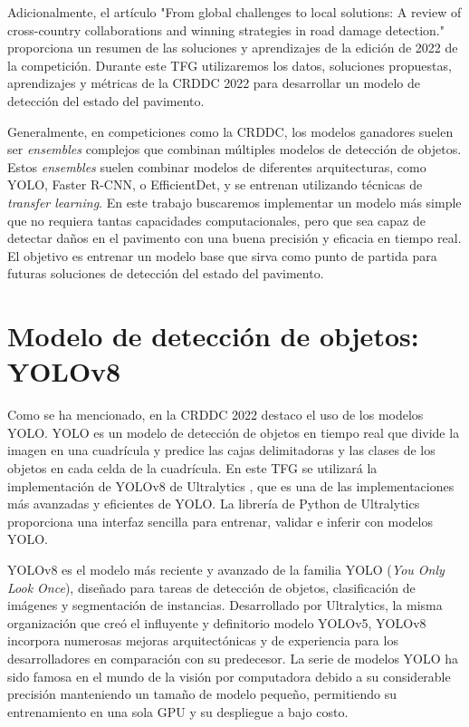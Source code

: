Adicionalmente, el artículo "From global challenges to local solutions: A review of cross-country collaborations and winning strategies in road damage detection." \cite{CRDDC2022_review} proporciona un resumen de las soluciones y aprendizajes de la edición de 2022 de la competición. Durante este TFG utilizaremos los datos, soluciones propuestas, aprendizajes y métricas de la CRDDC 2022 para desarrollar un modelo de detección del estado del pavimento.

Generalmente, en competiciones como la CRDDC, los modelos ganadores suelen ser \textit{ensembles} complejos que combinan múltiples modelos de detección de objetos. Estos \textit{ensembles} suelen combinar modelos de diferentes arquitecturas, como YOLO, Faster R-CNN, o EfficientDet, y se entrenan utilizando técnicas de \textit{transfer learning}. En este trabajo buscaremos implementar un modelo más simple que no requiera tantas capacidades computacionales, pero que sea capaz de detectar daños en el pavimento con una buena precisión y eficacia en tiempo real. El objetivo es entrenar un modelo base que sirva como punto de partida para futuras soluciones de detección del estado del pavimento.


\section{Modelo de detección de objetos: YOLOv8}
Como se ha mencionado, en la CRDDC 2022 destaco el uso de los modelos YOLO. YOLO \cite{YOLO} es un modelo de detección de objetos en tiempo real que divide la imagen en una cuadrícula y predice las cajas delimitadoras y las clases de los objetos en cada celda de la cuadrícula. En este TFG se utilizará la implementación de YOLOv8 de Ultralytics \cite{yolov8_ultralytics}, que es una de las implementaciones más avanzadas y eficientes de YOLO. La librería de Python de Ultralytics proporciona una interfaz sencilla para entrenar, validar e inferir con modelos YOLO.

YOLOv8 es el modelo más reciente y avanzado de la familia YOLO (\textit{You Only Look Once}), diseñado para tareas de detección de objetos, clasificación de imágenes y segmentación de instancias. Desarrollado por Ultralytics, la misma organización que creó el influyente y definitorio modelo YOLOv5, YOLOv8 incorpora numerosas mejoras arquitectónicas y de experiencia para los desarrolladores en comparación con su predecesor. La serie de modelos YOLO ha sido famosa en el mundo de la visión por computadora debido a su considerable precisión manteniendo un tamaño de modelo pequeño, permitiendo su entrenamiento en una sola GPU y su despliegue a bajo costo.

